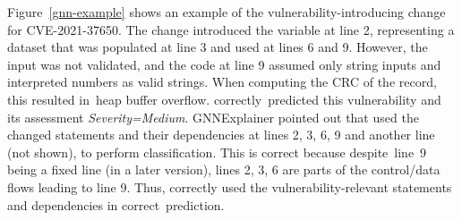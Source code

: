 





\vspace{3pt}
 Figure~\ref{gnn-example} shows an example of
the vulnerability-introduc\-ing change for CVE-2021-37650. The change
introduced the variable  at line 2,
representing a dataset that was populated at line 3 and used at lines
6 and 9. However, the input was not validated, and the code at line 9
assumed only string inputs and interpreted numbers as valid strings.
When computing the CRC of the record, this resulted in~heap buffer
overflow. {\tool} correctly~predicted this vulnerability and its
assessment {\em Severity=Medium}. GNNExplainer pointed out that
{\tool} used the changed statements and their dependencies at lines 2,
3, 6, 9 and another line (not shown), to perform classification. This
is correct because despite~line~9 being a fixed line (in a later
version), lines 2, 3, 6 are parts of the control/data flows leading to
line 9. Thus, {\tool} correctly used the vulnerability-relevant
statements and dependencies in correct~prediction.







	
	
